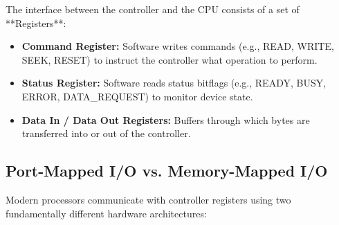 The interface between the controller and the CPU consists of a set of **Registers**:
\begin{itemize}
    \item \textbf{Command Register:} Software writes commands (e.g., READ, WRITE, SEEK, RESET) to instruct the controller what operation to perform.
    \item \textbf{Status Register:} Software reads status bitflags (e.g., READY, BUSY, ERROR, DATA\_REQUEST) to monitor device state.
    \item \textbf{Data In / Data Out Registers:} Buffers through which bytes are transferred into or out of the controller.
\end{itemize}

\subsection{Port-Mapped I/O vs. Memory-Mapped I/O}
Modern processors communicate with controller registers using two fundamentally different hardware architectures:

